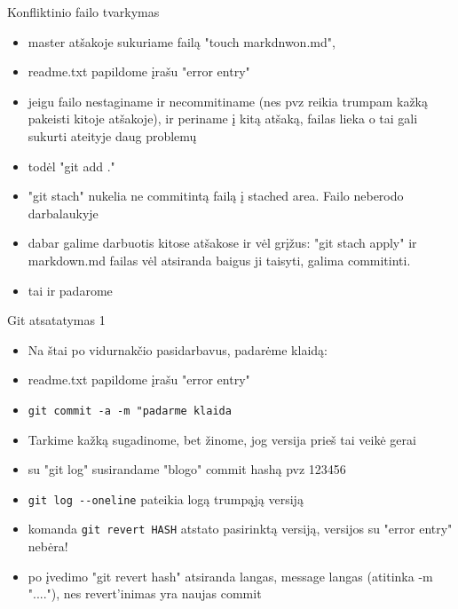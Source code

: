 \documentclass[11pt,xcolor=table]{beamer}
\begin{document}
\begin{frame}[fragile]{Konfliktinio failo tvarkymas}
\begin{itemize}
\item master atšakoje sukuriame failą "touch markdnwon.md", 
\item readme.txt papildome įrašu "error entry"
\item jeigu failo nestaginame ir necommitiname (nes pvz reikia trumpam kažką pakeisti kitoje atšakoje), ir periname į kitą atšaką, failas lieka o tai gali sukurti ateityje daug problemų
\item todėl  "git add ."
\item "git stach" nukelia ne commitintą failą į stached area. Failo neberodo darbalaukyje
\item dabar galime darbuotis kitose atšakose ir vėl grįžus: "git stach apply" ir markdown.md failas vėl atsiranda baigus ji taisyti, galima commitinti.
\item tai ir padarome
\end{itemize}
\end{frame}


\begin{frame}[fragile]{Git atsatatymas 1}
\begin{itemize}
\item Na štai po vidurnakčio pasidarbavus, padarėme klaidą:
\item readme.txt papildome įrašu "error entry" 
\item \colorbox{listinggray}{\lstinline|git commit -a -m "padarme klaida|}
\item Tarkime kažką sugadinome, bet žinome, jog versija prieš tai veikė gerai
\item su "git log" susirandame "blogo" commit hashą  pvz 123456
\item \colorbox{listinggray}{\lstinline|git log --oneline|} pateikia logą trumpąją versiją
\item komanda \colorbox{listinggray}{\lstinline|git revert HASH|} atstato pasirinktą versiją, versijos su "error entry" nebėra!
\item po įvedimo "git revert hash" atsiranda langas, message langas (atitinka -m "...."), nes revert'inimas yra naujas commit
\end{itemize}
\end{frame}

\end{document}

